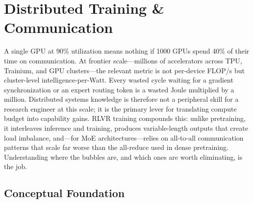 \section{Distributed Training \& Communication}

\smallskip

\begin{whythis}
A single GPU at 90\% utilization means nothing if 1000 GPUs spend 40\% of their time on communication.
At frontier scale---millions of accelerators across TPU, Trainium, and GPU clusters---the relevant metric
is not per-device FLOP/s but cluster-level intelligence-per-Watt.
Every wasted cycle waiting for a gradient synchronization or an expert routing token is a wasted Joule
multiplied by a million.
Distributed systems knowledge is therefore not a peripheral skill for a research engineer at this scale;
it is the primary lever for translating compute budget into capability gains.
RLVR training compounds this: unlike pretraining, it interleaves inference and training, produces
variable-length outputs that create load imbalance, and---for MoE architectures---relies on all-to-all
communication patterns that scale far worse than the all-reduce used in dense pretraining.
Understanding where the bubbles are, and which ones are worth eliminating, is the job.
\end{whythis}

\subsection*{Conceptual Foundation}

